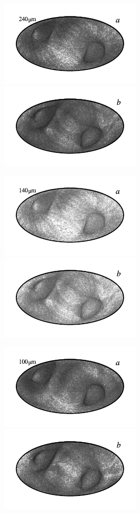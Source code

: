 \documentclass{aa}
\begin{document}
\begin{figure}
	\centering
	\includegraphics{figs/rms_maps/rms_10a_c0001_000019.pdf}\includegraphics{figs/rms_maps/rms_10b_c0001_000019.pdf}
  \vspace*{-0.85cm}

	\includegraphics{figs/rms_maps/rms_09a_c0001_000019.pdf}\includegraphics{figs/rms_maps/rms_09b_c0001_000019.pdf}
  \vspace*{-0.85cm}

	\includegraphics{figs/rms_maps/rms_08a_c0001_000019.pdf}\includegraphics{figs/rms_maps/rms_08b_c0001_000019.pdf}
  \vspace*{-0.85cm}


\end{figure}
\end{document}
